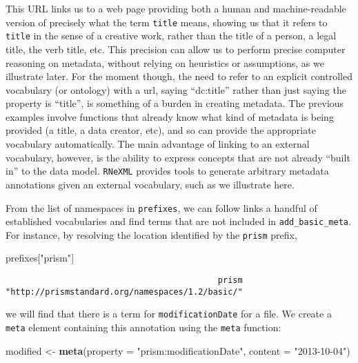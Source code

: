 \documentclass[author-year, review, 11pt]{components/elsarticle} %
\newenvironment{Shaded}{\begin{snugshade}}{\end{snugshade}}
\newcommand{\KeywordTok}[1]{\textcolor[rgb]{0.13,0.29,0.53}{\textbf{{#1}}}}
\newcommand{\DataTypeTok}[1]{\textcolor[rgb]{0.13,0.29,0.53}{{#1}}}
\newcommand{\StringTok}[1]{\textcolor[rgb]{0.31,0.60,0.02}{{#1}}}
\newcommand{\NormalTok}[1]{{#1}}
\begin{document}
This URL links us to a web page providing both a human and
machine-readable version of precisely what the term \texttt{title}
means, showing us that it refers to \texttt{title} in the sense of a
creative work, rather than the title of a person, a legal title, the
verb title, etc. This precision can allow us to perform precise computer
reasoning on metadata, without relying on heuristics or assumptions, as
we illustrate later. For the moment though, the need to refer to an
explicit controlled vocabulary (or ontology) with a url, saying
``dc:title'' rather than just saying the property is ``title'', is
something of a burden in creating metadata. The previous examples
involve functions that already know what kind of metadata is being
provided (a title, a data creator, etc), and so can provide the
appropriate vocabulary automatically. The main advantage of linking to
an external vocabulary, however, is the ability to express concepts that
are not already ``built in'' to the data model. \texttt{RNeXML} provides
tools to generate arbitrary metadata annotations given an external
vocabulary, such as we illustrate here.

From the list of namespaces in \texttt{prefixes}, we can follow links a
handful of established vocabularies and find terms that are not included
in \texttt{add\_basic\_meta}. For instance, by resolving the location
identified by the \texttt{prism} prefix,

\begin{Shaded}
\begin{Highlighting}[]
\NormalTok{prefixes[}\StringTok{"prism"}\NormalTok{]}
\end{Highlighting}
\end{Shaded}

\begin{verbatim}
                                           prism 
"http://prismstandard.org/namespaces/1.2/basic/" 
\end{verbatim}

we will find that there is a term for \texttt{modificationDate} for a
file. We create a \texttt{meta} element containing this annotation using
the \texttt{meta} function:

\begin{Shaded}
\begin{Highlighting}[]
\NormalTok{modified <-}\StringTok{ }\KeywordTok{meta}\NormalTok{(}\DataTypeTok{property =} \StringTok{"prism:modificationDate"}\NormalTok{, }\DataTypeTok{content =} \StringTok{"2013-10-04"}\NormalTok{)}
\end{Highlighting}
\end{Shaded}
\end{document}
